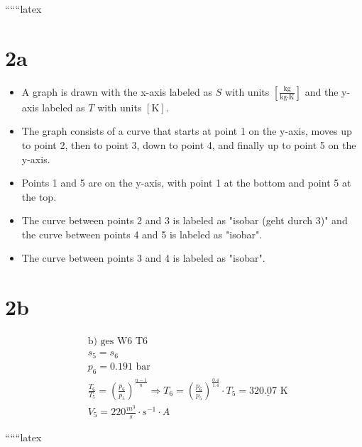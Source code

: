 
``````latex


\section*{2a}

\begin{itemize}
    \item A graph is drawn with the x-axis labeled as $S$ with units $\left[\frac{\text{kg}}{\text{kg} \cdot \text{K}}\right]$ and the y-axis labeled as $T$ with units $[\text{K}]$.
    \item The graph consists of a curve that starts at point 1 on the y-axis, moves up to point 2, then to point 3, down to point 4, and finally up to point 5 on the y-axis.
    \item Points 1 and 5 are on the y-axis, with point 1 at the bottom and point 5 at the top.
    \item The curve between points 2 and 3 is labeled as "isobar (geht durch 3)" and the curve between points 4 and 5 is labeled as "isobar".
    \item The curve between points 3 and 4 is labeled as "isobar".
\end{itemize}

\section*{2b}

\begin{align*}
    &\text{b) ges W6 T6} \\
    &s_5 = s_6 \\
    &p_6 = 0.191 \text{ bar} \\
    &\frac{T_6}{T_5} = \left(\frac{p_6}{p_5}\right)^{\frac{n-1}{n}} \Rightarrow T_6 = \left(\frac{p_6}{p_5}\right)^{\frac{0.4}{1.4}} \cdot T_5 = 32 \underline{0.07} \text{ K} \\
    &V_5 = 220 \frac{m^3}{s} \cdot s^{-1} \cdot A
\end{align*}

``````latex


